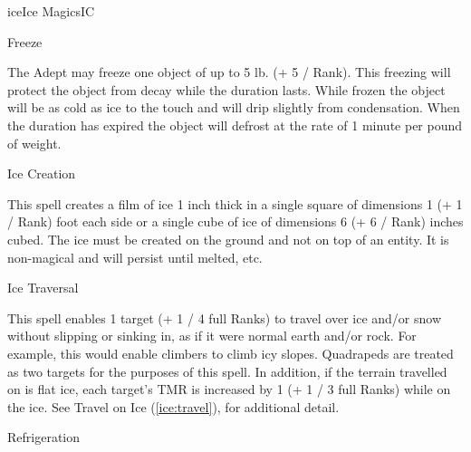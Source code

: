 \begin{college}[1.5]{ice}{Ice Magics}{IC}
\begin{spell}[G-2]{Freeze}

\begin{effects}
The Adept may freeze one object of up to 5 lb. (+ 5 / Rank). This
freezing will protect the object from decay while the duration
lasts. While frozen the object will be as cold as ice to the touch and
will drip slightly from condensation. When the duration has expired
the object will defrost at the rate of 1 minute per pound of weight.
\end{effects}
\end{spell}

\begin{spell}[G-3]{Ice Creation}

\begin{effects}
This spell creates a film of ice 1 inch thick in a single square of
dimensions 1 (+ 1 / Rank) foot each side or a single cube of ice of
dimensions 6 (+ 6 / Rank) inches cubed.  The ice must be created on
the ground and not on top of an entity.  It is non-magical and will
persist until melted, etc.

\end{effects}
\end{spell}

\begin{spell}[G-4]{Ice Traversal}

\begin{effects}
This spell enables 1 target (+ 1 / 4 full Ranks) to travel over ice
and/or snow without slipping or sinking in, as if it were normal earth
and/or rock.  For example, this would enable climbers to climb icy
slopes.  Quadrapeds are treated as two targets for the purposes of
this spell.  In addition, if the terrain travelled on is flat ice,
each target's TMR is increased by 1 (+ 1 / 3 full Ranks) while on the
ice.  See Travel on Ice (\ref{ice:travel}), for additional detail.
\end{effects}
\end{spell}

\begin{spell}[G-5]{Refrigeration}


\end{spell}
\end{college}
